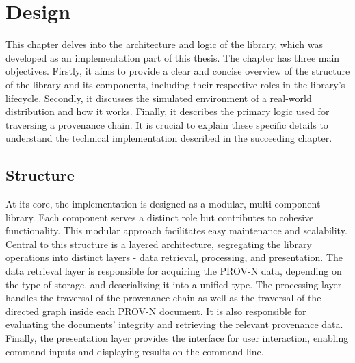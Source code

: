 \documentclass[
  digital,     %
  oneside,     %
  nosansbold,  %
  nocolorbold, %
  lof,         %
  lot,         %
]{fithesis4}
\begin{document}
\chapter{Design}
\shorthandoff{-}
This chapter delves into the architecture and logic of the library, which was developed as an implementation part of this thesis. The chapter has three main objectives. Firstly, it aims to provide a clear and concise overview of the structure of the library and its components, including their respective roles in the library's lifecycle. Secondly, it discusses the simulated environment of a real-world distribution and how it works. Finally, it describes the primary logic used for traversing a provenance chain. It is crucial to explain these specific details to understand the technical implementation described in the succeeding chapter. 
\shorthandon{-}
\section{Structure}
\shorthandoff{-}
At its core, the implementation is designed as a modular, multi-component library. Each component serves a distinct role but contributes to cohesive functionality. This modular approach facilitates easy maintenance and scalability. Central to this structure is a layered architecture, segregating the library operations into distinct layers - data retrieval, processing, and presentation. 
The data retrieval layer is responsible for acquiring the PROV-N data, depending on the type of storage, and deserializing it into a unified type. 
The processing layer handles the traversal of the provenance chain as well as the traversal of the directed graph inside each PROV-N document. It is also responsible for evaluating the documents' integrity and retrieving the relevant provenance data.
Finally, the presentation layer provides the interface for user interaction, enabling command inputs and displaying results on the command line.
\shorthandon{-}
\end{document}
